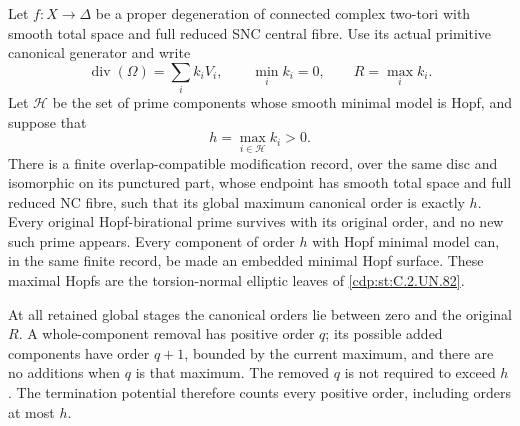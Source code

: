 \begin{proposition}\label{cdp:st:C.2.UN.84}

Let \(f:X\to\Delta\) be a proper degeneration of connected
complex two-tori with smooth total space and full reduced
SNC central fibre. Use its actual primitive canonical
generator and write
\[
 \operatorname{div}(\Omega)=\sum_i k_iV_i,\qquad
 \min_i k_i=0,\qquad R=\max_i k_i.
 \tag{C.TK.1}\label{cdp:eq:C.TK.1}
\]
Let \(\mathcal H\) be the set of prime components whose
smooth minimal model is Hopf, and suppose that
\[
                  h=\max_{i\in\mathcal H}k_i>0.
 \tag{C.TK.2}\label{cdp:eq:C.TK.2}
\]
There is a finite overlap-compatible modification record,
over the same disc and isomorphic on its punctured part,
whose endpoint has smooth total space and full reduced
NC fibre, such that its global maximum canonical order
is exactly \(h\). Every original Hopf-birational prime
survives with its original order, and no new such prime
appears. Every component of order \(h\) with Hopf minimal
model can, in the same finite record, be made an embedded
minimal Hopf surface. These maximal Hopfs are the
torsion-normal elliptic leaves of \ref{cdp:st:C.2.UN.82}.

At all retained global stages the canonical orders lie
between zero and the original \(R\). A whole-component
removal has positive order \(q\); its possible added
components have order \(q+1\), bounded by the current
maximum, and there are no additions when \(q\) is that
maximum. The removed \(q\) is not required to exceed
\(h\). The termination potential therefore counts every
positive order, including orders at most \(h\).


\end{proposition}

